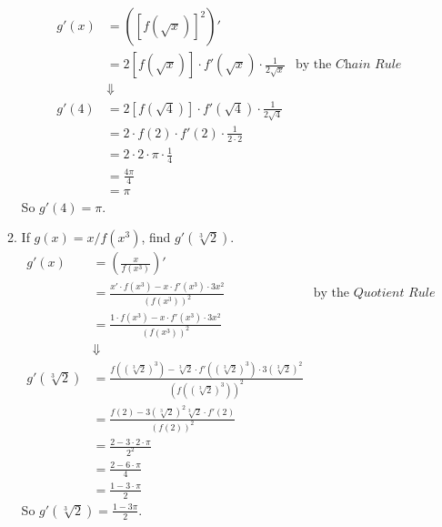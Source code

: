 \documentclass[12pt,letterpaper]{article}
\theoremstyle{case}
\theoremstyle{definition}
\begin{document}
\begin{enumerate}
\begin{enumerate}
			\begin{align*}
				g'(x) &= ([f(\sqrt{x})]^2)' \\
				&= 2[f(\sqrt{x})] \cdot f'(\sqrt{x}) \cdot \frac{1}{2\sqrt{x}} &\text{by the } \textit{Chain Rule} \\
				&\Downarrow \\
				g'(4) &= 2[f(\sqrt{4})] \cdot f'(\sqrt{4}) \cdot \frac{1}{2 \sqrt{4}} \\
				&= 2 \cdot f(2) \cdot f'(2) \cdot \frac{1}{2 \cdot 2} \\
				&= 2 \cdot 2 \cdot \pi \cdot \frac{1}{4} \\
				&= \frac{4\pi}{4} \\
				&= \pi
			\end{align*}
			So $g'(4)=\pi$.\\
			\item If $g(x)=x/f(x^3)$, find $g'(\sqrt[3]{2})$. \\
			
			\begin{align*}
				g'(x) &= \left(\frac{x}{f(x^3)}\right)' \\
				&= \frac{x' \cdot f(x^3) - x \cdot f'(x^3) \cdot 3x^2}{\left(f(x^3)\right)^2} &\text{by the } \textit{Quotient Rule} \\
				&= \frac{1 \cdot f(x^3)-x \cdot f'(x^3) \cdot 3x^2}{(f(x^3))^2} \\
				&\Downarrow \\
				g'(\sqrt[3]{2}) &= \frac{f((\sqrt[3]{2})^3)-\sqrt[3]{2} \cdot f'((\sqrt[3]{2})^3) \cdot 3(\sqrt[3]{2})^2}{(f((\sqrt[3]{2})^3))^2} \\
				&= \frac{f(2)-3(\sqrt[3]{2})^2\sqrt[3]{2} \cdot f'(2)}{(f(2))^2} \\
				&= \frac{2-3\cdot 2 \cdot \pi}{2^2} \\
				&= \frac{2-6 \cdot \pi}{4} \\
				&= \frac{1-3 \cdot \pi}{2}
			\end{align*}
			So $g'(\sqrt[3]{2})=\frac{1-3\pi}{2}$.\\
			

\end{enumerate}
\end{enumerate}
\end{document}
